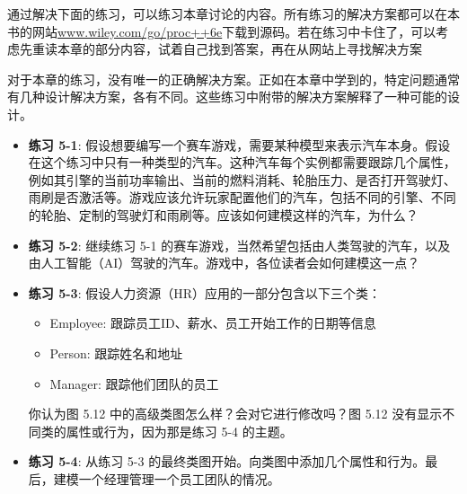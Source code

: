 通过解决下面的练习，可以练习本章讨论的内容。所有练习的解决方案都可以在本书的网站\url{www.wiley.com/go/proc++6e}下载到源码。若在练习中卡住了，可以考虑先重读本章的部分内容，试着自己找到答案，再在从网站上寻找解决方案

对于本章的练习，没有唯一的正确解决方案。正如在本章中学到的，特定问题通常有几种设计解决方案，各有不同。这些练习中附带的解决方案解释了一种可能的设计。

\begin{itemize}
\item
\textbf{练习 5-1}: 假设想要编写一个赛车游戏，需要某种模型来表示汽车本身。假设在这个练习中只有一种类型的汽车。这种汽车每个实例都需要跟踪几个属性，例如其引擎的当前功率输出、当前的燃料消耗、轮胎压力、是否打开驾驶灯、雨刷是否激活等。游戏应该允许玩家配置他们的汽车，包括不同的引擎、不同的轮胎、定制的驾驶灯和雨刷等。应该如何建模这样的汽车，为什么？

\item
\textbf{练习 5-2}: 继续练习 5-1 的赛车游戏，当然希望包括由人类驾驶的汽车，以及由人工智能（AI）驾驶的汽车。游戏中，各位读者会如何建模这一点？

\item
\textbf{练习 5-3}: 假设人力资源（HR）应用的一部分包含以下三个类：

\begin{itemize}
\item
Employee: 跟踪员工ID、薪水、员工开始工作的日期等信息

\item
Person: 跟踪姓名和地址

\item
Manager: 跟踪他们团队的员工
\end{itemize}

你认为图 5.12 中的高级类图怎么样？会对它进行修改吗？图 5.12 没有显示不同类的属性或行为，因为那是练习 5-4 的主题。


\item
\textbf{练习 5-4}: 从练习 5-3 的最终类图开始。向类图中添加几个属性和行为。最后，建模一个经理管理一个员工团队的情况。
\end{itemize}








